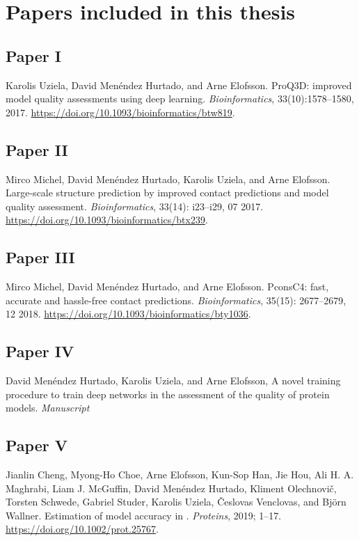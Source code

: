 \chapter*{Papers included in this thesis}

\section*{Paper \textcolor[cmyk]{0, 0.87, 0.68, 0.32}{I}}
Karolis Uziela\first, David Menéndez Hurtado\first, and Arne Elofsson.
ProQ3D: improved model quality assessments using deep learning. \textit{Bioinformatics}, 33(10):1578–1580, 2017.
\URL \url{ https://doi.org/10.1093/bioinformatics/btw819}.

\section*{Paper  \textcolor[cmyk]{0, 0.87, 0.68, 0.32}{II}}
Mirco Michel, David Menéndez Hurtado, Karolis Uziela, and Arne Elofsson.
Large-scale structure
prediction by improved contact predictions and model quality assessment. \textit{Bioinformatics}, 33(14):
i23–i29, 07 2017.  \URL
\url{https://doi.org/10.1093/bioinformatics/btx239}.


\section*{Paper \textcolor[cmyk]{0, 0.87, 0.68, 0.32}{III}}
Mirco Michel\first, David Menéndez Hurtado\first, and Arne Elofsson. PconsC4: fast, accurate and hassle-free
contact predictions. \textit{Bioinformatics}, 35(15): 2677–2679, 12 2018. \URL \url{https://doi.org/10.1093/bioinformatics/bty1036}.


\section*{Paper \textcolor[cmyk]{0, 0.87, 0.68, 0.32}{IV}}
David Menéndez Hurtado, Karolis Uziela, and Arne Elofsson, A novel training procedure to train deep networks in the assessment of the quality of protein models. \emph{Manuscript}


\section*{Paper \textcolor[cmyk]{0, 0.87, 0.68, 0.32}{V}}

Jianlin Cheng\first, Myong-Ho Choe\first, Arne Elofsson\first, Kun-Sop Han\first, Jie Hou\first, Ali H. A. Maghrabi\first, Liam J.
McGuffin\first, David Menéndez Hurtado\first, Kliment Olechnovič\first, Torsten Schwede\first, Gabriel Studer\first, Karolis
Uziela\first, Česlovas Venclovas\first, and Björn Wallner\first. Estimation of model accuracy in . \emph{Proteins}, 2019; 1--17. \URL \url{https://doi.org/10.1002/prot.25767}.

